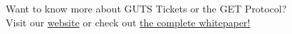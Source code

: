 \documentclass[letterpaper,10pt]{article}
\begin{document}
\begin{center}
	Want to know more about GUTS Tickets or the GET Protocol? \\ 
    Visit our \href{https://guts.tickets/}{\textcolor{gutsoranje}{website}} or check out \href{https://guts.tickets/files/GET-Whitepaper-GUTS-Tickets-latest.pdf}{ \textcolor{gutsoranje}{the complete whitepaper!}}
\end{center}

\end{document}

